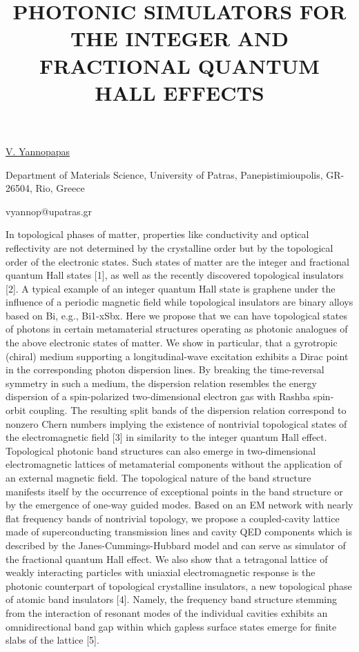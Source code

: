 \title{PHOTONIC SIMULATORS FOR THE INTEGER AND FRACTIONAL QUANTUM HALL EFFECTS}

\underline{V. Yannopapas} 

{\normalsize{\vspace{-4mm}
Department of Materials Science, University of Patras, Panepistimioupolis, GR-26504, Rio, Greece

\email vyannop@upatras.gr}}

In topological phases of matter, properties like conductivity and optical reflectivity are not determined by the crystalline order but by the topological order of the electronic states. Such states of matter are the integer and fractional quantum Hall states [1], as well as the recently discovered topological insulators [2]. A typical example of an integer quantum Hall state is graphene under the influence of a periodic magnetic field while topological insulators are binary alloys based on Bi, e.g., Bi1-xSbx. Here we propose that we can have topological states of photons in certain metamaterial structures operating as photonic analogues of the above electronic states of matter.
We show in particular, that a gyrotropic (chiral) medium supporting a longitudinal-wave excitation exhibits a Dirac point in the corresponding photon dispersion lines. By breaking the time-reversal symmetry in such a medium, the dispersion relation resembles the energy dispersion of a spin-polarized two-dimensional electron gas with Rashba spin-orbit coupling. The resulting split bands of the dispersion relation correspond to nonzero Chern numbers implying the existence of nontrivial topological states of the electromagnetic field [3] in similarity to the integer quantum Hall effect.
Topological photonic band structures can also emerge in two-dimensional electromagnetic lattices of metamaterial components without the application of an external magnetic field. The topological nature of the band structure manifests itself by the occurrence of exceptional points in the band structure or by the emergence of one-way guided modes. Based on an EM network with nearly flat frequency bands of nontrivial topology, we propose a coupled-cavity lattice made of superconducting transmission lines and cavity QED components which is described by the Janes-Cummings-Hubbard model and can serve as simulator of the fractional quantum Hall effect.
We also show that a tetragonal lattice of weakly interacting particles with uniaxial electromagnetic response is the photonic counterpart of topological crystalline insulators, a new topological phase of atomic band insulators [4]. Namely, the frequency band structure stemming from the interaction of resonant modes of the individual cavities exhibits an omnidirectional band gap within which gapless surface states emerge for finite slabs of the lattice [5].

